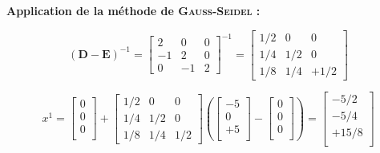 \documentclass[12pt]{report}
\newcommand{\E}{\mathbf{E}}
\newcommand{\D}{\mathbf{D}}
\begin{document}
\textbf{Application de la méthode de \textsc{Gauss-Seidel} : }

\begin{equation}
\left( \D - \E \right)^{-1} = \begin{bmatrix}
2 & 0 & 0 \\ 
-1 & 2 & 0 \\ 
0  &  -1 & 2 
\end{bmatrix}^{-1} =  \begin{bmatrix}
1/2 & 0 & 0 \\ 
1/4 & 1/2 & 0 \\ 
1/8  &  1/4 & +1/2 
\end{bmatrix}
\end{equation}

\begin{equation}
x^1 = \begin{bmatrix}
0  \\
0 \\
0 \\
\end{bmatrix}+ \begin{bmatrix}
1/2 & 0 & 0 \\ 
1/4 & 1/2 & 0 \\ 
1/8  &  1/4 & 1/2 
\end{bmatrix} \left(\begin{bmatrix}
-5  \\
0 \\
+5 \\
\end{bmatrix} - \begin{bmatrix}
0  \\
0 \\
0 \\
\end{bmatrix}  \right) = \begin{bmatrix}
-5/2  \\
-5/4 \\
+15/8 \\
\end{bmatrix}
\end{equation}
\end{document}
